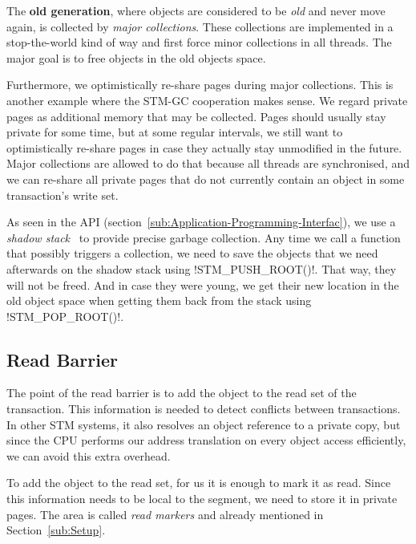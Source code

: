 \documentclass{sigplanconf}
\makeatletter
\renewcommand\lstinline[1][]{%
  \Collectverb{\@@myverb}%
}
\def\@@myverb#1{%
    \begingroup
    \fboxsep=0.2em
    \colorbox{verylightgray}{\oldlstinline|#1|}%
    \endgroup
}
\makeatother
\begin{document}
The \textbf{old generation}, where objects are considered to be
\emph{old} and never move again, is collected by \emph{major
  collections}.  These collections are implemented in a stop-the-world
kind of way and first force minor collections in all threads. The
major goal is to free objects in the old objects space.

Furthermore, we optimistically re-share pages during major collections.
This is another example where the STM-GC cooperation makes sense. We
regard private pages as additional memory that may be collected.
Pages should usually stay private for some time, but at some regular
intervals, we still want to optimistically re-share pages in case they actually
stay unmodified in the future. Major collections are allowed to do
that because all threads are synchronised, and we can re-share all
private pages that do not currently contain an object in some
transaction's  write set.

As seen in the API (section~\ref{sub:Application-Programming-Interfac}),
we use a \emph{shadow stack}~\cite{fergus02} to provide precise garbage
collection.  Any time we call a function that possibly triggers a
collection, we need to save the objects that we need afterwards on the
shadow stack using \lstinline!STM_PUSH_ROOT()!.  That way, they will
not be freed. And in case they were young, we get their new location
in the old object space when getting them back from the stack using
\lstinline!STM_POP_ROOT()!.




\subsection{Read Barrier}

The point of the read barrier is to add the object to the read set of
the transaction. This information is needed to detect conflicts
between transactions. In other STM systems, it also resolves an object reference to
a private copy, but since the CPU performs our address translation on
every object access efficiently, we can avoid this extra overhead.

To add the object to the read set, for us it is enough to mark it as
read. Since this information needs to be local to the segment, we need
to store it in private pages. The area is called \emph{read markers}
and already mentioned in Section~\ref{sub:Setup}.
\end{document}
